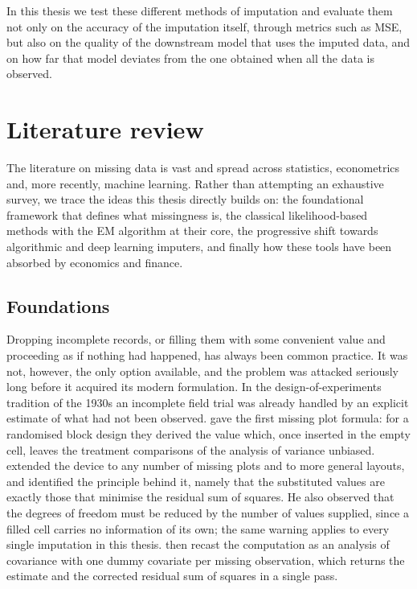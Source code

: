 In this thesis we test these different methods of imputation and evaluate them not
only on the accuracy of the imputation itself, through metrics such as MSE, but
also on the quality of the downstream model that uses the imputed data, and on how
far that model deviates from the one obtained when all the data is observed.

\section{Literature review}
\label{sec:literature}

The literature on missing data is vast and spread across statistics,
econometrics and, more recently, machine learning. Rather than
attempting an exhaustive survey, we trace the ideas this thesis
directly builds on: the foundational framework that defines what
missingness is, the classical likelihood-based methods with the EM
algorithm at their core, the progressive shift towards algorithmic and
deep learning imputers, and finally how these tools have been absorbed
by economics and finance.

\subsection{Foundations}
\label{sec:lit_foundations}

Dropping incomplete records, or filling them with some convenient
value and proceeding as if nothing had happened, has always been
common practice. It was not, however, the only option available, and
the problem was attacked seriously long before it acquired its modern
formulation. In the design-of-experiments tradition of the 1930s an
incomplete field trial was already handled by an explicit estimate of
what had not been observed. \citet{allan1930} gave the first missing
plot formula: for a randomised block design they derived the value
which, once inserted in the empty cell, leaves the treatment
comparisons of the analysis of variance unbiased. \citet{yates1933}
extended the device to any number of missing plots and to more general
layouts, and identified the principle behind it, namely that the
substituted values are exactly those that minimise the residual sum of
squares. He also observed that the degrees of freedom must be reduced
by the number of values supplied, since a filled cell carries no
information of its own; the same warning applies to every single
imputation in this thesis. \citet{bartlett1937} then recast the
computation as an analysis of covariance with one dummy covariate per
missing observation, which returns the estimate and the corrected
residual sum of squares in a single pass.

